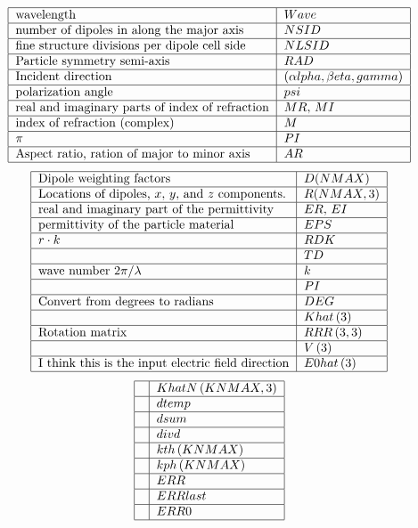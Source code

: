 \documentclass{article}
\begin{document}
\[
\begin{tabular}{|l|l|}
\hline
wavelength & $Wave$ \\ \hline
number of dipoles in along the major axis & $NSID$ \\ \hline
fine structure divisions per dipole cell side & $NLSID$ \\ \hline
Particle symmetry semi-axis & $RAD$ \\ \hline
Incident direction & $\left( \alpha lpha,\beta eta,gamma\right) $ \\ \hline
polarization angle & $psi$ \\ \hline
real and imaginary parts of index of refraction & $MR,$ $MI$ \\ \hline
index of refraction (complex) & $M$ \\ \hline
$\pi $ & $PI$ \\ \hline
Aspect ratio, ration of major to minor axis & $AR$ \\ \hline
\end{tabular}%
\]%
\[
\begin{tabular}{|l|l|}
\hline
Dipole weighting factors & $D(NMAX)$ \\ \hline
Locations of dipoles, $x,$ $y,$ and $z$ components. & $R(NMAX,3)$ \\ \hline
real and imaginary part of the permittivity & $ER,$ $EI$ \\ \hline
permittivity of the particle material & $EPS$ \\ \hline
$r\cdot k$ & $RDK$ \\ \hline
& $TD$ \\ \hline
wave number $2\pi /\lambda $ & $k$ \\ \hline
& $PI$ \\ \hline
Convert from degrees to radians & $DEG$ \\ \hline
& $Khat\left( 3\right) $ \\ \hline
Rotation matrix & $RRR\left( 3,3\right) $ \\ \hline
& $V\left( 3\right) $ \\ \hline
I think this is the input electric field direction & $E0hat\left( 3\right) $
\\ \hline
\end{tabular}%
\]%
\[
\begin{tabular}{|l|l|}
\hline
& $KhatN\left( KNMAX,3\right) $ \\ \hline
& $dtemp$ \\ \hline
& $dsum$ \\ \hline
& $divd$ \\ \hline
& $kth\left( KNMAX\right) $ \\ \hline
& $kph\left( KNMAX\right) $ \\ \hline
& $ERR$ \\ \hline
& $ERRlast$ \\ \hline
& $ERR0$ \\ \hline
\end{tabular}%
\]%
\end{document}
